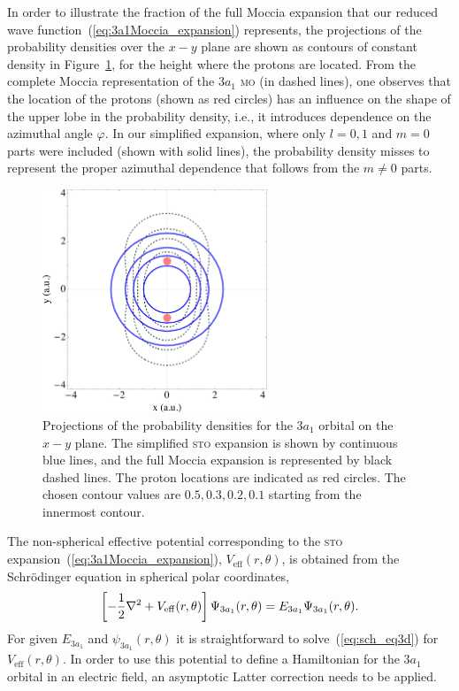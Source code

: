 In order to illustrate the fraction of the full Moccia expansion that
our reduced wave function~(\ref{eq:3a1Moccia_expansion}) represents,
the projections of the probability densities over the $x-y$ plane are
shown as contours of constant density in
Figure~\ref{fig:3a1_xycontours}, for the height where the protons are
located. From the complete Moccia representation of the $3a_{1}$
\textsc{mo} (in dashed lines), one observes that the location of the
protons (shown as red circles) has an influence on the shape of the
upper lobe in the probability density, i.e., it introduces dependence
on the azimuthal angle $\varphi$. In our simplified expansion, where
only $l=0,1$ and $m=0$ parts were included (shown with solid lines),
the probability density misses to represent the proper azimuthal
dependence that follows from the $m\neq 0$ parts.

\begin{figure}
  \centering
  \includegraphics[width=0.6\textwidth]{figures/ch_H2O/3a1/orbitals3a1.eps}
  \caption{Projections of the probability densities for the $3a_{1}$
    orbital on the $x-y$ plane. The simplified \textsc{sto} expansion
    is shown by continuous blue lines, and the full Moccia expansion
    is represented by black dashed lines. The proton locations are
    indicated as red circles. The chosen contour values are $0.5, 0.3,
    0.2, 0.1$ starting from the innermost contour.}
  \label{fig:3a1_xycontours}
\end{figure}

The non-spherical effective potential corresponding to the
\textsc{sto} expansion~(\ref{eq:3a1Moccia_expansion}),
$V_{\mathrm{eff}}(r,\theta)$, is obtained from the Schr\"{o}dinger
equation in spherical polar coordinates,
%
\begin{eqnarray}
  \left[ -\frac{1}{2} \nabla^{2} +
  V_{\rm{eff}}(r,\theta) \right] \Psi_{3a_{1}}(r,\theta) =
  E_{3a_{1}} \Psi_{3a_{1}}(r,\theta).
\label{eq:sch_eq3d}
\end{eqnarray}
%
For given $E_{3a_{1}}$ and $\psi_{3a_{1}}(r,\theta)$ it is
straightforward to solve~(\ref{eq:sch_eq3d}) for
$V_{\mathrm{eff}}(r,\theta)$. In order to use this potential to define
a Hamiltonian for the $3a_{1}$ orbital in an electric field, an
asymptotic Latter correction needs to be applied.


